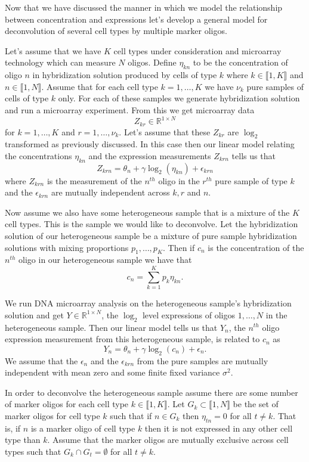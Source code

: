 \documentclass[reqno,12pt,oneside]{report}\usepackage[]{graphicx}\usepackage[]{color}
\theoremstyle{plain}
\theoremstyle{definition}
\theoremstyle{remark}
\numberwithin{theorem}{chapter}     %
\begin{document}
Now that we have discussed the manner in which we model the relationship between concentration and expressions let's develop a general model for deconvolution of several cell types by multiple marker oligos. 

Let's assume that we have $K$ cell types under consideration and microarray technology which can measure $N$ oligos. Define $\eta_{kn}$ to be the concentration of oligo $n$ in hybridization solution produced by cells of type $k$ where $k\in\llbracket 1,K\rrbracket$ and $n\in\llbracket 1,N\rrbracket$. Assume that for each cell type $k=1,\ldots,K$ we have $\nu_k$ pure samples of cells of type $k$ only. For each of these samples we generate hybridization solution and run a microarray experiment. From this we get microarray data 
\[
Z_{kr} \in \mathbb{R}^{1\times N}
\]
for $k=1,\ldots,K$ and $r=1,\ldots,\nu_k$. Let's assume that these $Z_{kr}$ are $\log_2$ transformed as previously discussed. In this case then our linear model relating the concentrations $\eta_{kn}$ and the expression measurements $Z_{krn}$ tells us that
\[
Z_{krn} = \theta_n + \gamma \log_2\left(\eta_{kn}\right)+\epsilon_{krn}
\]
where $Z_{krn}$ is the measurement of the $n^{th}$ oligo in the $r^{th}$ pure sample of type $k$ and the $\epsilon_{krn}$ are mutually independent across $k,r$ and $n$.

Now assume we also have some heterogeneous sample that is a mixture of the $K$ cell types. This is the sample we would like to deconvolve. Let the hybridization solution of our heterogeneous sample be a mixture of pure sample hybridization solutions with mixing proportions $p_1,\ldots,p_K$. Then if $c_n$ is the concentration of the $n^{th}$ oligo in our heterogeneous sample we have that 
\[
c_n = \sum_{k=1}^{K}p_k\eta_{kn}.
\]

We run DNA microarray analysis on the heterogeneous sample's hybridization solution and get $Y\in\mathbb{R}^{1\times N}$, the $\log_2$ level expressions of oligos $1,\ldots,N$ in the heterogeneous sample. Then our linear model tells us that $Y_n$, the $n^{th}$ oligo expression measurement from this heterogeneous sample, is related to $c_n$ as
\[
Y_n = \theta_n + \gamma\log_2\left(c_n\right)+\epsilon_n.
\]
We assume that the $\epsilon_n$ and the $\epsilon_{krn}$ from the pure samples are mutually independent with mean zero and some finite fixed variance $\sigma^2$.

In order to deconvolve the heterogeneous sample assume there are some number of marker oligos for each cell type $k\in\llbracket1, K\rrbracket$. Let $G_k\subset\llbracket 1, N\rrbracket$ be the set of marker oligos for cell type $k$ such that if $n \in G_k$ then $\eta_{tn}=0$ for all $t \neq k$. That is, if $n$ is a marker oligo of cell type $k$ then it is not expressed in any other cell type than $k$. Assume that the marker oligos are mutually exclusive across cell types such that $G_k\cap G_t=\emptyset$ for all $t \neq k$. 
\end{document}
